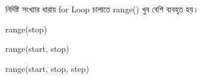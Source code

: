 

নির্দিষ্ট সংখ্যার ধারায়
\textenglish{\ttfamily for}
Loop চালাতে
\textenglish{\ttfamily range()}
খুব বেশি ব্যবহৃত হয়।

\begin{center}

\textenglish{\ttfamily range(stop)}

\qquad

\textenglish{\ttfamily range(start, stop)}

\qquad

\textenglish{\ttfamily range(start, stop, step)}

\end{center}


